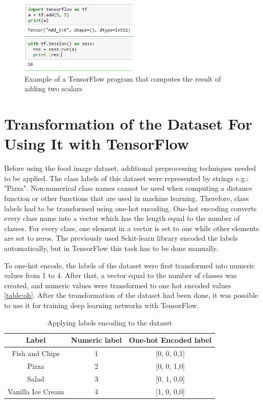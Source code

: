 \begin{figure}[h]
\centering
\includegraphics[width=0.5\textwidth]{Figures/4/sess.jpg}
\caption{Example of a TensorFlow program that computes the result of adding two scalars}
\label{fig:sess}
\end{figure}

\section{Transformation of the Dataset For Using It with TensorFlow}

Before using the food image dataset, additional preprocessing techniques needed to be applied. The class labels of this dataset were represented by strings e.g.: "Pizza". Non-numerical class names cannot be used when computing a distance function or other functions that are used in machine learning. Therefore, class labels had to be transformed using one-hot encoding. One-hot encoding converts every class name into a vector which has the length equal to the number of classes. For every class, one element in a vector is set to one while other elements are set to zeros. The previously used Sckit-learn library encoded the labels automatically, but in TensorFlow this task has to be done manually.

To one-hot encode, the labels of the dataset were first transformed into numeric values from 1 to 4. After that, a vector equal to the number of classes was created, and numeric values were transformed to one hot encoded values \autoref{table:oh}. After the transformation of the dataset had been done, it was possible to use it for training deep learning networks with TensorFlow.


\begin{table}[h]
\begin{center}
\begin{tabular}{ |c|c|c| } 
 \hline
 Label &   Numeric label & One-hot Encoded label  \\   \hline
 Fish and Chips    &   1  &   [0, 0, 0,1]  \\
            Pizza   &   2 &    [0, 0, 1,0]    \\
            Salad    &   3 &    [0, 1, 0,0]    \\
Vanilla Ice Cream     &  4  &   [1, 0, 0,0]    \\ 
 \hline
\end{tabular}
\caption{Applying labels encoding to the dataset}
\label{table:oh}
\end{center}
\end{table}


